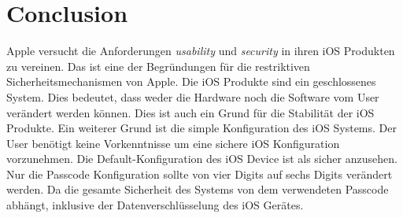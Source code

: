 %
%
%
% 

\chapter{Conclusion}
\label{ch:Conclusion}
Apple versucht die  Anforderungen \textit{\glqq usability\grqq{}} und \textit{\glqq security\grqq{}} in ihren iOS Produkten zu vereinen. Das ist eine der Begründungen für die restriktiven Sicherheitsmechanismen von Apple. Die iOS Produkte sind ein geschlossenes System. Dies bedeutet, dass weder die Hardware noch die Software vom User verändert werden können. Dies ist auch ein Grund für die Stabilität der iOS Produkte. Ein weiterer Grund ist die simple Konfiguration des iOS Systems. Der User benötigt keine Vorkenntnisse um eine sichere iOS Konfiguration vorzunehmen. Die Default-Konfiguration des iOS Device ist als sicher anzusehen. Nur die Passcode Konfiguration sollte von vier Digits auf sechs Digits verändert werden. Da die gesamte Sicherheit des Systems von dem verwendeten Passcode abhängt, inklusive der Datenverschlüsselung des iOS Gerätes. \par 

